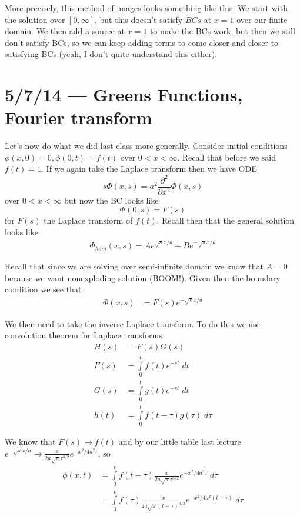 \documentclass[10pt]{report}
\newcommand{\ptd}[2]{\frac{\partial^2 #1}{\partial#2^2}}
\begin{document}
More precisely, this method of images looks something like this. We start with the solution over $[0,\infty]$, but this doesn't satisfy $BCs$ at $x=1$ over our finite domain. We then add a source at $x=1$ to make the BCs work, but then we still don't satisfy BCs, so we can keep adding terms to come closer and closer to satisfying BCs (yeah, I don't quite understand this either). 

\chapter{5/7/14 --- Greens Functions, Fourier transform}

Let's now do what we did last class more generally. Consider initial conditions $\phi(x,0) = 0, \phi(0,t) = f(t)$ over $0 < x < \infty$. Recall that before we said $f(t) = 1$. If we again take the Laplace transform then we have ODE
\begin{equation}
    s\Phi(x,s) = a^2 \ptd{}{x}\Phi(x,s)\label{5.7.heat}
\end{equation}
over $0 < x < \infty$ but now the BC looks like
\begin{equation}
    \Phi(0,s) = F(s)
\end{equation}
for $F(s)$ the Laplace transform of $f(t)$. Recall then that the general solution looks like
\begin{align}
    \Phi_{hom}(x,s) = Ae^{\sqrt{s}x/a} + Be^{-\sqrt{s}x/a}
\end{align}

Recall that since we are solving over semi-infinite domain we know that $A = 0$ because we want nonexploding solution (BOOM!). Given then the boundary condition we see that
\begin{align}
    \Phi(x,s) &= F(s)e^{-\sqrt{s}x/a}
\end{align}

We then need to take the inverse Laplace transform. To do this we use convolution theorem for Laplace transforms
\begin{align}
    H(s) &= F(s)G(s)\\
    F(s) &= \int\limits_{0}^{t}f(t)e^{-st}\;dt\\
    G(s) &= \int\limits_{0}^{t}g(t)e^{-st}\;dt\\
    h(t) &= \int\limits_{0}^{t}f(t - \tau) g(\tau)\;d\tau\label{5.7.conv}
\end{align}

We know that $F(s) \to f(t)$ and by our little table last lecture $e^{-\sqrt{s}x/a} \to \frac{x}{2a\sqrt{\pi} \tau^{3/2}}e^{-x^2/4a^2\tau}$, so
\begin{align}
    \phi(x,t) &= \int\limits_{0}^{t}f(t - \tau)\frac{x}{2a\sqrt{\pi} \tau^{3/2}}e^{-x^2/4a^2\tau}\;d\tau\\
    &= \int\limits_{0}^{t}f(\tau)\frac{x}{2a\sqrt{\pi} (t-\tau)^{3/2}}e^{-x^2/4a^2(t-\tau)}\;d\tau\label{5.7.sol}
\end{align}
\end{document}
